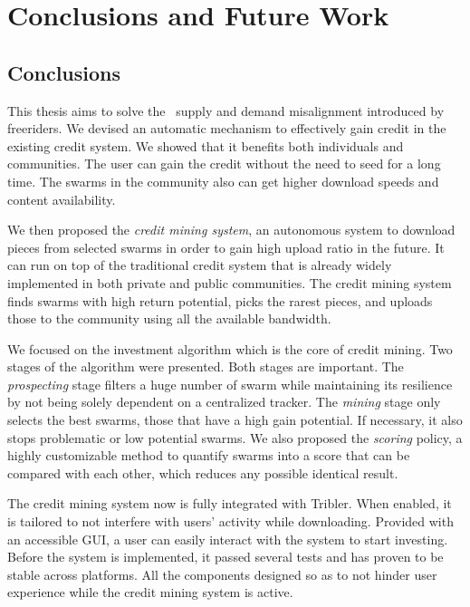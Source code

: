 \chapter{Conclusions and Future Work}
\label{chp:conclusionsandfuturework}

\section{Conclusions}
This thesis aims to solve the \bt~supply and demand misalignment introduced by freeriders. We devised an automatic mechanism to effectively gain credit in the existing credit system. We showed that it benefits both individuals and communities. The user can gain the credit without the need to seed for a long time. The swarms in the community also can get higher download speeds and content availability.

We then proposed the \textit{credit mining system}, an autonomous system to download pieces from selected swarms in order to gain high upload ratio in the future. It can run on top of the traditional credit system that is already widely implemented in both private and public communities. The credit mining system finds swarms with high return potential, picks the rarest pieces, and uploads those to the community using all the available bandwidth.

We focused on the investment algorithm which is the core of credit mining. Two stages of the algorithm were presented. Both stages are important. The \textit{prospecting} stage filters a huge number of swarm while maintaining its resilience by not being solely dependent on a centralized tracker. The \textit{mining} stage only selects the best swarms, those that have a high gain potential. If necessary, it also stops problematic or low potential swarms. We also proposed the \textit{scoring} policy, a highly customizable method to quantify swarms into a score that can be compared with each other, which reduces any possible identical result.

The credit mining system now is fully integrated with Tribler. When enabled, it is tailored to not interfere with users' activity while downloading. Provided with an accessible GUI, a user can easily interact with the system to start investing. Before the system is implemented, it passed several tests and has proven to be stable across platforms. All the components designed so as to not hinder user experience while the credit mining system is active.

